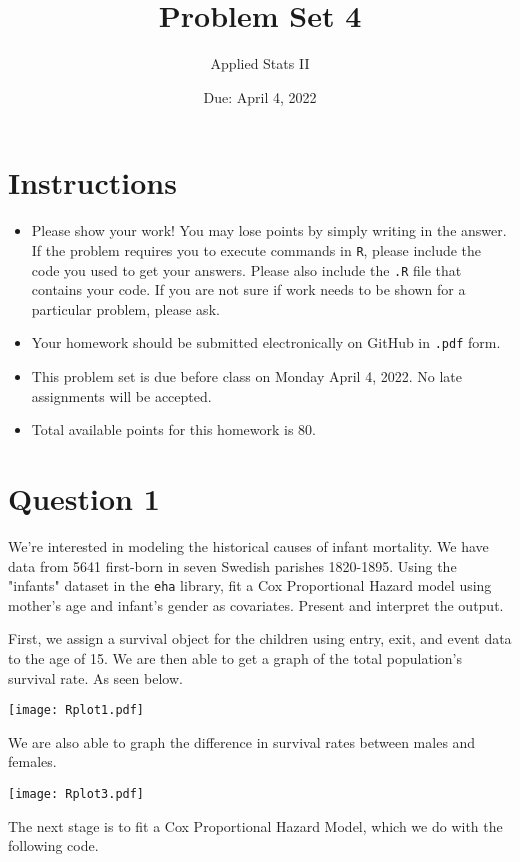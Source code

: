 \documentclass[12pt,letterpaper]{article}
\title{Problem Set 4}
\date{Due: April 4, 2022}
\author{Applied Stats II}
\begin{document}
	\maketitle
	\section*{Instructions}
	\begin{itemize}
		\item Please show your work! You may lose points by simply writing in the answer. If the problem requires you to execute commands in \texttt{R}, please include the code you used to get your answers. Please also include the \texttt{.R} file that contains your code. If you are not sure if work needs to be shown for a particular problem, please ask.
		\item Your homework should be submitted electronically on GitHub in \texttt{.pdf} form.
		\item This problem set is due before class on Monday April 4, 2022. No late assignments will be accepted.
		\item Total available points for this homework is 80.
	\end{itemize}

	\vspace{.25cm}
\section*{Question 1}
\vspace{.25cm}
\noindent We're interested in modeling the historical causes of infant mortality. We have data from 5641 first-born in seven Swedish parishes 1820-1895. Using the "infants" dataset in the \texttt{eha} library, fit a Cox Proportional Hazard model using mother's age and infant's gender as covariates. Present and interpret the output.



First, we assign a survival object for the children using entry, exit, and event data to the age of 15. We are then able to get a graph of the total population's survival rate. As seen below. 
 
\texttt{[image: Rplot1.pdf]}

We are also able to graph the difference in survival rates between males and females.

\texttt{[image: Rplot3.pdf]} 

The next stage is to fit a Cox Proportional Hazard Model, which we do with the following code. 
\end{document}
